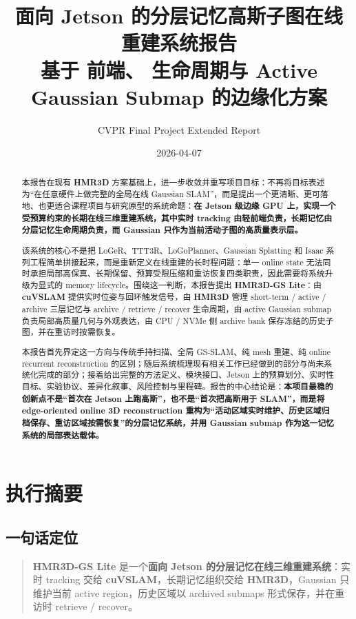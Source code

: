 \documentclass[12pt]{article}
\title{
面向 Jetson 的分层记忆高斯子图在线重建系统报告\\
\large 基于 \cuvslam{} 前端、\hmr{} 生命周期与 Active Gaussian Submap 的边缘化方案
}
\author{CVPR Final Project Extended Report}
\date{2026-04-07}
\newcommand{\system}{\textbf{HMR3D-GS Lite}}
\newcommand{\hmr}{\textbf{HMR3D}}
\newcommand{\cuvslam}{\textbf{cuVSLAM}}
\begin{document}
\maketitle

\begin{abstract}
本报告在现有 \hmr{} 方案基础上，进一步收敛并重写项目目标：不再将目标表述为“在任意硬件上做完整的全局在线 Gaussian SLAM”，而是提出一个更清晰、更可落地、也更适合课程项目与研究原型的系统命题：\textbf{在 Jetson 级边缘 GPU 上，实现一个受预算约束的长期在线三维重建系统，其中实时 tracking 由轻前端负责，长期记忆由分层记忆生命周期负责，而 Gaussian 只作为当前活动子图的高质量表示层。}

该系统的核心不是把 LoGeR、TTT3R、LoGoPlanner、Gaussian Splatting 和 Isaac 系列工程简单拼接起来，而是重新定义在线重建的长时程问题：单一 online state 无法同时承担局部高保真、长期保留、预算受限压缩和重访恢复四类职责，因此需要将系统升级为显式的 memory lifecycle。围绕这一判断，本报告提出 \system{}：由 \cuvslam{} 提供实时位姿与回环触发信号，由 \hmr{} 管理 short-term / active / archive 三层记忆与 archive / retrieve / recover 生命周期，由 active Gaussian submap 负责局部高质量几何与外观表达，由 CPU / NVMe 侧 archive bank 保存冻结的历史子图，并在重访时按需恢复。

本报告首先界定这一方向与传统手持扫描、全局 GS-SLAM、纯 mesh 重建、纯 online recurrent reconstruction 的区别；随后系统梳理现有相关工作已经做到的部分与尚未系统化完成的部分；接着给出完整的方法定义、模块接口、Jetson 上的预算划分、实时性目标、实验协议、差异化叙事、风险控制与里程碑。报告的中心结论是：\textbf{本项目最稳的创新点不是“首次在 Jetson 上跑高斯”，也不是“首次把高斯用于 SLAM”，而是将 edge-oriented online 3D reconstruction 重构为“活动区域实时维护、历史区域归档保存、重访区域按需恢复”的分层记忆系统，并用 Gaussian submap 作为这一记忆系统的局部表达载体。}
\end{abstract}

\tableofcontents
\newpage

\section{执行摘要}

\subsection{一句话定位}

\begin{quote}
\system{} 是一个\textbf{面向 Jetson 的分层记忆在线三维重建系统}：实时 tracking 交给 \cuvslam{}，长期记忆组织交给 \hmr{}，Gaussian 只维护当前 active region，历史区域以 archived submaps 形式保存，并在重访时 retrieve / recover。
\end{quote}
\end{document}
